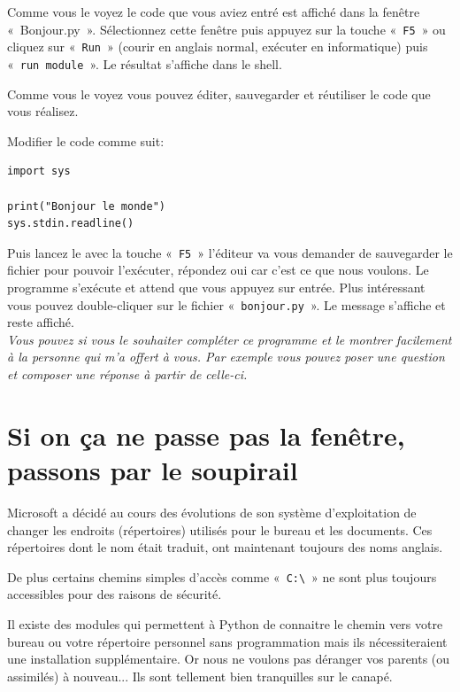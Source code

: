 Comme vous le voyez le code que vous aviez entré est affiché dans la fenêtre «~Bonjour.py~». Sélectionnez cette fenêtre puis appuyez sur la touche «~\texttt{F5}~» ou cliquez sur «~\texttt{Run}~» (courir en anglais normal, exécuter en informatique) puis «~\texttt{run module}~». Le résultat s'affiche dans le shell.

Comme vous le voyez vous pouvez éditer, sauvegarder et réutiliser le code que vous réalisez.

Modifier le code comme suit: 

\begin{Verbatim}[frame=single,rulecolor=\color{mbleu}, label=à taper]
import sys

print("Bonjour le monde")
sys.stdin.readline()
\end{Verbatim}

Puis lancez le avec la touche «~\texttt{F5}~» l'éditeur va vous demander de sauvegarder le fichier pour pouvoir l'exécuter, répondez oui car c'est ce que nous voulons. Le programme s'exécute et attend que vous appuyez sur entrée. Plus intéressant vous pouvez double-cliquer sur le fichier «~\texttt{bonjour.py}~». Le message s'affiche et reste affiché. \\

\emph{Vous pouvez si vous le souhaiter compléter ce programme et le montrer facilement à la personne qui m'a offert à vous. Par exemple vous pouvez poser une question et composer une réponse à partir de celle-ci.}\\

\section{Si on ça ne passe pas la fenêtre, passons par le soupirail}
Microsoft a décidé au cours des évolutions de son système d'exploitation de changer les endroits (répertoires) utilisés pour le bureau et les documents. Ces répertoires dont le nom était traduit, ont maintenant toujours des noms anglais.

De plus certains chemins simples d'accès comme «~\Verb+C:\+~» ne sont plus toujours accessibles pour des raisons de sécurité.

Il existe des modules qui permettent à Python de connaitre le chemin vers votre bureau ou votre répertoire personnel sans programmation mais ils nécessiteraient une installation supplémentaire. Or nous ne voulons pas déranger vos parents (ou assimilés) à nouveau... Ils sont tellement bien tranquilles sur le canapé.

